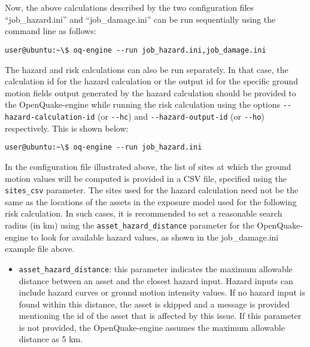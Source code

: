 \inputminted[firstline=1,firstnumber=1,fontsize=\footnotesize,frame=single,linenos,bgcolor=lightgray,label=job\_hazard.ini]{ini}{oqum/risk/verbatim/config_scenario_hazard.ini}\\

\inputminted[firstline=1,firstnumber=1,fontsize=\footnotesize,frame=single,linenos,bgcolor=lightgray,label=job\_damage.ini]{ini}{oqum/risk/verbatim/config_scenario_damage_minimal.ini}\\

Now, the above calculations described by the two configuration files
``job\_hazard.ini'' and ``job\_damage.ini'' can be run sequentially using the
command line as follows:

\begin{Verbatim}[frame=single, commandchars=\\\{\}, samepage=true]
user@ubuntu:~\$ oq-engine --run job_hazard.ini,job_damage.ini
\end{Verbatim}

The hazard and risk calculations can also be run separately. In that case, the
calculation id for the hazard calculation or the output id for the specific
ground motion fields output generated by the hazard calculation should be
provided to the OpenQuake-engine while running the risk calculation using the
options \Verb+--hazard-calculation-id+ (or \Verb+--hc+) and 
\Verb+--hazard-output-id+ (or \Verb+--ho+) respectively. This is shown below:

\begin{Verbatim}[frame=single, commandchars=\\\{\}, samepage=true]
user@ubuntu:~\$ oq-engine --run job_hazard.ini
\end{Verbatim}

In the configuration file illustrated above, the list of sites at which the
ground motion values will be computed is provided in a CSV file, specified
using the \Verb+sites_csv+ parameter. The sites used for the hazard
calculation  need not be the same as the locations of the assets in the
exposure model used  for the following risk calculation. In such cases, it is
recommended to set a reasonable search radius (in km) using the
\Verb+asset_hazard_distance+ parameter for the OpenQuake-engine to look for
available hazard values, as shown in the job\_damage.ini example file above.

\begin{itemize}

  \item \Verb+asset_hazard_distance+: this parameter indicates the maximum
    allowable distance between an \gls{asset} and the closest hazard input.
    Hazard inputs can include hazard curves or ground motion intensity values.
    If no hazard input is found within this distance, the \gls{asset} is
    skipped and a message is provided mentioning the id of the asset that is
    affected by this issue. If this parameter is not provided, the
    OpenQuake-engine assumes the maximum allowable distance as 5 km.

\end{itemize}

